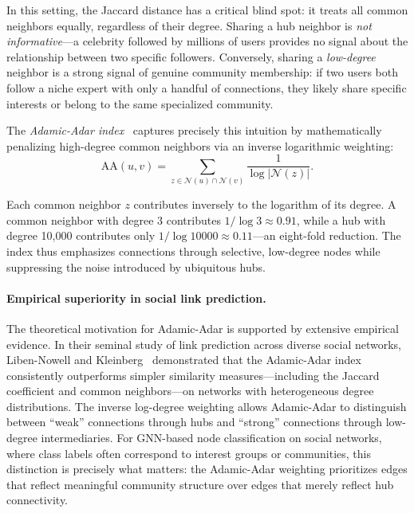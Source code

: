\documentclass[conference]{IEEEtran}
\begin{document}
In this setting, the Jaccard distance has a critical blind spot: it treats all common neighbors equally, regardless of their degree. Sharing a hub neighbor is \emph{not informative}---a celebrity followed by millions of users provides no signal about the relationship between two specific followers. Conversely, sharing a \emph{low-degree} neighbor is a strong signal of genuine community membership: if two users both follow a niche expert with only a handful of connections, they likely share specific interests or belong to the same specialized community.

The \emph{Adamic-Adar index}~\cite{adamic2003} captures precisely this intuition by mathematically penalizing high-degree common neighbors via an inverse logarithmic weighting:
\begin{equation}
    \text{AA}(u, v) = \sum_{z \in \mathcal{N}(u) \cap \mathcal{N}(v)} \frac{1}{\log |\mathcal{N}(z)|}.
    \label{eq:adamic_adar}
\end{equation}

Each common neighbor $z$ contributes inversely to the logarithm of its degree. A common neighbor with degree 3 contributes $1/\log 3 \approx 0.91$, while a hub with degree 10{,}000 contributes only $1/\log 10000 \approx 0.11$---an eight-fold reduction. The index thus emphasizes connections through selective, low-degree nodes while suppressing the noise introduced by ubiquitous hubs.

\paragraph{Empirical superiority in social link prediction.} The theoretical motivation for Adamic-Adar is supported by extensive empirical evidence. In their seminal study of link prediction across diverse social networks, Liben-Nowell and Kleinberg~\cite{liben2007} demonstrated that the Adamic-Adar index consistently outperforms simpler similarity measures---including the Jaccard coefficient and common neighbors---on networks with heterogeneous degree distributions. The inverse log-degree weighting allows Adamic-Adar to distinguish between ``weak'' connections through hubs and ``strong'' connections through low-degree intermediaries. For GNN-based node classification on social networks, where class labels often correspond to interest groups or communities, this distinction is precisely what matters: the Adamic-Adar weighting prioritizes edges that reflect meaningful community structure over edges that merely reflect hub connectivity.
\end{document}
